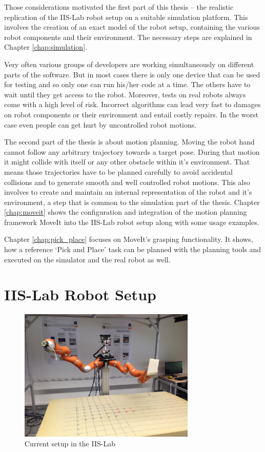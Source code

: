 Those considerations motivated the first part of this thesis -- the realistic replication of the IIS-Lab robot setup on a suitable simulation platform. This involves the creation of an exact model of the robot setup, containing the various robot components and their environment. The necessary steps are explained in Chapter \ref{chap:simulation}.


Very often various groups of developers are working simultaneously on different parts of the software. But in most cases there is only one device that can be used for testing and so only one can run his/her code at a time. The others have to wait until they get access to the robot. Moreover, tests on real robots always come with a high level of risk. Incorrect algorithms can lead very fast to damages on robot components or their environment and entail costly repairs. In the worst case even people can get hurt by uncontrolled robot motions.



The second part of the thesis is about motion planning. Moving the robot hand cannot follow any arbitrary trajectory towards a target pose. During that motion it might collide with itself or any other obstacle within it's environment. That means those trajectories have to be planned carefully to avoid accidental collisions and to generate smooth and well controlled robot motions. This also involves to create and maintain an internal representation of the robot and it's environment, a step that is common to the simulation part of the thesis. Chapter \ref{chap:moveit} shows the configuration and integration of the motion planning framework MoveIt into the IIS-Lab robot setup along with some usage examples.

Chapter \ref{chap:pick_place} focuses on MoveIt's grasping functionality. It shows, how a reference `Pick and Place' task can be planned with the planning tools  and executed on the simulator and the real robot as well.

\section{IIS-Lab Robot Setup}
\begin{figure}[ht]
	\centering
  \includegraphics[width=0.75\textwidth]{images/robot_setup.jpg}
	\caption{Current setup in the IIS-Lab}
	\label{fig:iis_setup}
\end{figure}

